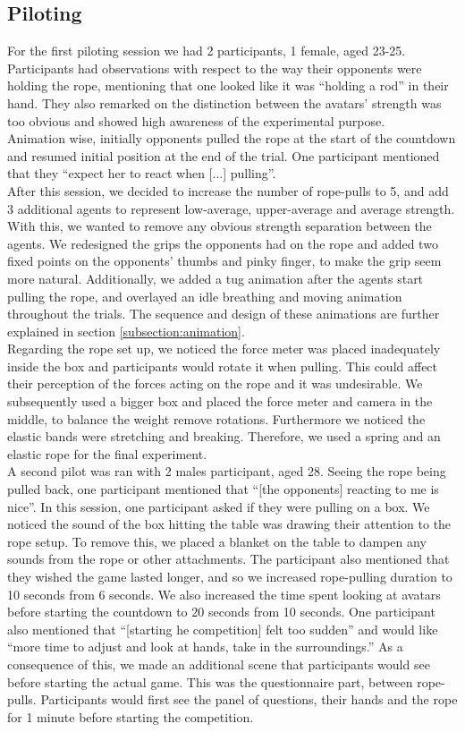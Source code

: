 \subsection{Piloting}
\label{subsection:Piloting}
 For the first piloting session we had 2 participants, 1 female, aged 23-25. Participants had observations with respect to the way their opponents were holding the rope, mentioning that one looked like it was ``holding a rod'' in their hand. They also remarked on the distinction between the avatars' strength was too obvious and showed high awareness of the experimental purpose. 
 \\
 Animation wise, initially opponents pulled the rope at the start of the countdown and resumed initial position at the end of the trial. One participant mentioned that they ``expect her to react when [...] pulling''.
 \\
 After this session, we decided to increase the number of rope-pulls to 5, and add 3 additional agents to represent low-average, upper-average and average strength. With this, we wanted to remove any obvious strength separation between the agents. We redesigned the grips the opponents had on the rope and added two fixed points on the opponents' thumbs and pinky finger, to make the grip seem more natural. 
Additionally, we added a tug animation after the agents start pulling the rope, and overlayed an idle breathing and moving animation throughout the trials. The sequence and design of these animations are further explained in section \ref{subsection:animation}.
\\
 Regarding the rope set up, we noticed the force meter was placed inadequately inside the box and participants would rotate it when pulling. This could affect their perception of the forces acting on the rope and it was undesirable. We subsequently used a bigger box and placed the force meter and camera in the middle, to balance the weight remove rotations. Furthermore we noticed the elastic bands were stretching and breaking. Therefore, we used a spring and an elastic rope for the final experiment.
 \\
  A second pilot was ran with 2 males participant, aged 28. Seeing the rope being pulled back, one participant mentioned that ``[the opponents] reacting to me is nice''. In this session, one participant asked if they were pulling on a box. We noticed the sound of the box hitting the table was drawing their attention to the rope setup. To remove this, we placed a blanket on the table to dampen any sounds from the rope or other attachments. The participant also mentioned that they wished the game lasted longer, and so we increased rope-pulling duration to 10 seconds from 6 seconds. We also increased the time spent looking at avatars before starting the countdown to 20 seconds from 10 seconds. One participant also mentioned that ``[starting he competition] felt too sudden'' and would like ``more time to adjust and look at hands, take in the surroundings.'' As a consequence of this, we made an additional scene that participants would see before starting the actual game. This was the questionnaire part, between rope-pulls. Participants would first see the panel of questions, their hands and the rope for 1 minute before starting the competition.
